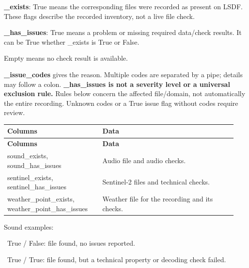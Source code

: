 \documentclass[a4paper,9pt]{extarticle}
\begin{document}
\textbf{\_exists}: True means the corresponding files were recorded as present on LSDF. These flags describe the recorded inventory, not a live file check.\par

\textbf{\_has\_issues}: True means a problem or missing required data/check results. It can be True whether \_exists is True or False.\par

Empty means no check result is available.\par

\textbf{\_issue\_codes} gives the reason. Multiple codes are separated by a pipe; details may follow a colon. \textbf{\_has\_issues is not a severity level or a universal exclusion rule.} Rules below concern the affected file/domain, not automatically the entire recording. Unknown codes or a True issue flag without codes require review.\par

\begingroup\small\begin{longtable}{>{\raggedright\arraybackslash}p{0.39\linewidth}>{\raggedright\arraybackslash}p{0.55\linewidth}}

\rowcolor{navy} \color{white}\bfseries Columns & \color{white}\bfseries Data \\

\endfirsthead

\rowcolor{navy} \color{white}\bfseries Columns & \color{white}\bfseries Data \\

\endhead

\rowcolor{pale} sound\_exists, sound\_has\_issues & Audio file and audio checks. \\

sentinel\_exists, sentinel\_has\_issues & Sentinel-2 files and technical checks. \\

\rowcolor{pale} weather\_point\_exists, weather\_point\_has\_issues & Weather file for the recording and its checks. \\

\end{longtable}\endgroup

Sound examples:\par

\noindent\textbullet\ True / False: file found, no issues reported.\par

\noindent\textbullet\ True / True: file found, but a technical property or decoding check failed.\par
\end{document}
